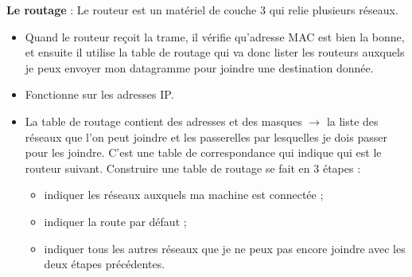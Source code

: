 \documentclass[a4paper,9pt, twocolumn]{article}
\newcommand\rar{\rightarrow}
\begin{document}
	\textbf{Le routage} : Le routeur est un matériel de couche 3 qui relie plusieurs réseaux.
	\begin{itemize}
		\item[\textbullet] Quand le routeur reçoit la trame, il vérifie qu'adresse MAC est bien la bonne, et ensuite il utilise la table de routage qui va donc lister les routeurs auxquels je peux envoyer mon datagramme pour joindre une destination donnée.
		\item[\textbullet] Fonctionne sur les adresses IP.
		\item[\textbullet] La table de routage contient des adresses et des masques $\rar$ la liste des réseaux que l'on peut joindre et les passerelles par lesquelles je dois passer pour les joindre.
			C'est une table de correspondance qui indique qui est le routeur suivant. Construire une table de routage se fait en 3 étapes :
		\begin{itemize}
			\item indiquer les réseaux auxquels ma machine est connectée ;
			\item indiquer la route par défaut ;
			\item indiquer tous les autres réseaux que je ne peux pas encore joindre avec les deux étapes précédentes.
		\end{itemize}
	\end{itemize}
\end{document}
